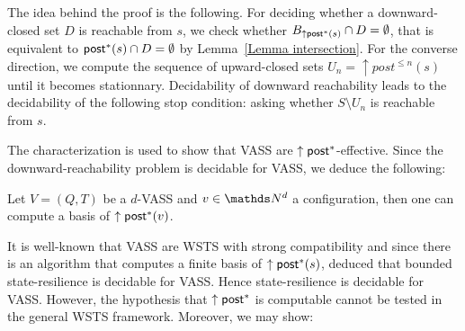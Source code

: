 The idea behind the proof is the following. For deciding whether a downward-closed set $D$ is reachable from $s$, we check whether
$B_{\uparrow \textsf{post}^*(s)} \cap D = \emptyset$, that is equivalent to $\textsf{post}^*(s)\cap D = \emptyset$ by
Lemma~\ref{Lemma intersection}. For the converse direction, we compute the sequence of upward-closed sets
$U_n = \uparrow post^{\leq n}(s)$ until it becomes stationnary. 
Decidability of downward reachability leads to the decidability of the following stop condition:
asking whether $S \setminus U_n$ is reachable from $s$.


The characterization is used to show that VASS are $\uparrow \textsf{post}^*$-effective. Since the downward-reachability problem is decidable for VASS, we deduce the following:

\begin{proposition}
Let $V= (Q,T)$ be a $d$-VASS and $v \in \N^d$ a configuration, then one can compute a basis of $\uparrow \textsf{post}^*(v)$.
\end{proposition}

\iffalse
\begin{proof}
By Proposition~\ref{post*}, a basis of $\uparrow \post^*(s)$ is computable for every state $s$ iff the downward-reachability problem is decidable.
Let us now show that the downward-reachability problem is decidable for Petri nets.
Let us consider a downward closed set $D$ in a Petri net.
Let us consider $B$ a basis of the upward-closed set $S \setminus D$.

$D$ is  defined by ... states where your number of counter is bounded by a constant (deduce this from ... having to be smaller than elements of the basis $B$), and others where it is unbounded. You have $m$ counters where it is bounded by $n$
then you have $m \times n$ possibilities for the values in these counters
you have unlimited possibilities for the values of the other counters,
but that is where the submarking problem comes in handy,
i.e. you ask the submarking problem for all of the $m \times n$ possibilities.

So downward-set reachability is decidable for PN.
\end{proof}
\fi

It is well-known that 
VASS are WSTS with strong compatibility and since there is an algorithm that computes a finite basis of  $\uparrow \post^*(s)$, \cite{DBLP:conf/gg/Ozkan22} deduced that bounded state-resilience is decidable for VASS.
Hence state-resilience is decidable for %
VASS.
However, the hypothesis that $\uparrow \textsf{post}^*$ is computable cannot be tested in the general WSTS framework. Moreover, we may show:

